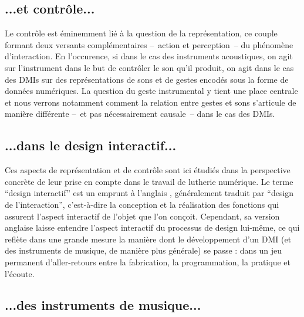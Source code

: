 \subsection{...et contrôle...}

\noindent Le contrôle est éminemment lié à la question de la représentation, ce couple formant deux versants complémentaires --~action et perception~-- du phénomène d'interaction. En l'occurence, si dans le cas des instruments acoustiques, on agit sur l'instrument dans le but de contrôler le son qu'il produit, on agit dans le cas des \glspl{DMI} sur des représentations de sons et de gestes encodés sous la forme de données numériques. La question du geste instrumental y tient une place centrale et nous verrons notamment comment la relation entre gestes et sons s'articule de manière différente --~et pas nécessairement causale~-- dans le cas des \glspl{DMI}.

\subsection{...dans le design interactif...}

\noindent Ces aspects de représentation et de contrôle sont ici étudiés dans la perspective concrète de leur prise en compte dans le travail de lutherie numérique. Le terme ``design interactif'' est un emprunt à l'anglais , généralement traduit par ``design de l'interaction'', c'est-à-dire la conception et la réalisation des fonctions qui assurent l'aspect interactif de l'objet que l'on conçoit. Cependant, sa version anglaise laisse entendre l'aspect interactif du processus de design lui-même, ce qui reflète dans une grande mesure la manière dont le développement d'un \gls{DMI} (et des instruments de musique, de manière plus générale) se passe : dans un jeu permanent d'aller-retours entre la fabrication, la programmation, la pratique et l'écoute.

\subsection{...des instruments de musique...}


